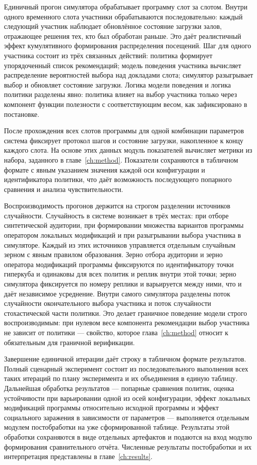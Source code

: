 Единичный прогон симулятора обрабатывает программу слот за слотом. Внутри одного временного слота участники обрабатываются последовательно: каждый следующий участник наблюдает обновлённое состояние загрузки залов, отражающее решения тех, кто был обработан раньше. Это даёт реалистичный эффект кумулятивного формирования распределения посещений. Шаг для одного участника состоит из трёх связанных действий: политика формирует упорядоченный список рекомендаций; модель поведения участника вычисляет распределение вероятностей выбора над докладами слота; симулятор разыгрывает выбор и обновляет состояние загрузки. Логика модели поведения и логика политики разделены явно: политика влияет на выбор участника только через компонент функции полезности с соответствующим весом, как зафиксировано в постановке.

После прохождения всех слотов программы для одной комбинации параметров система фиксирует протокол шагов и состояние загрузки, накопленное к концу каждого слота. На основе этих данных модуль показателей вычисляет метрики из набора, заданного в главе~\ref{ch:method}. Показатели сохраняются в табличном формате с явным указанием значения каждой оси конфигурации и идентификатора политики, что даёт возможность последующего попарного сравнения и анализа чувствительности.

Воспроизводимость прогонов держится на строгом разделении источников случайности. Случайность в системе возникает в трёх местах: при отборе синтетической аудитории, при формировании множества вариантов программы оператором локальных модификаций и при разыгрывании выбора участника в симуляторе. Каждый из этих источников управляется отдельным случайным зерном с явным правилом образования. Зерно отбора аудитории и зерно оператора модификаций программы фиксируются по идентификатору точки гиперкуба и одинаковы для всех политик и реплик внутри этой точки; зерно симулятора фиксируется по номеру реплики и варьируется между ними, что и даёт независимое усреднение. Внутри самого симулятора разделены поток случайности окончательного выбора участника и поток случайности стохастической части политики. Это делает граничное поведение модели строго воспроизводимым: при нулевом весе компонента рекомендации выбор участника не зависит от политики --- свойство, которое глава~\ref{ch:method} относит к обязательным для граничной верификации.

Завершение единичной итерации даёт строку в табличном формате результатов. Полный сценарный эксперимент состоит из последовательного выполнения всех таких итераций по плану эксперимента и их объединения в единую таблицу. Дальнейшая обработка результатов --- попарные сравнения политик, оценка устойчивости при варьировании одной из осей конфигурации, эффект локальных модификаций программы относительно исходной программы и эффект социального заражения в зависимости от параметров --- выполняется отдельным модулем постобработки на уже сформированной таблице. Результаты этой обработки сохраняются в виде отдельных артефактов и подаются на вход модулю формирования сравнительного отчёта. Численные результаты постобработки и их интерпретация представлены в главе~\ref{ch:results}.



